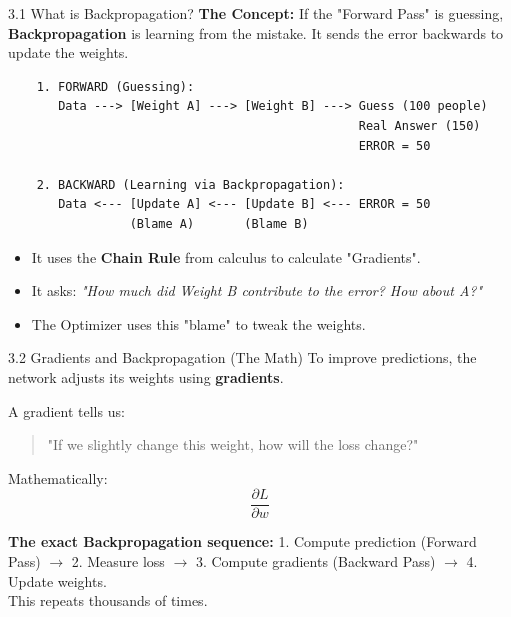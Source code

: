 \documentclass[aspectratio=169]{beamer}
\begin{document}

\begin{frame}[fragile]{3.1 What is Backpropagation?}
    \small
    \textbf{The Concept:}
    If the "Forward Pass" is guessing, \textbf{Backpropagation} is learning from the mistake. It sends the error backwards to update the weights.

    \begin{verbatim}
    1. FORWARD (Guessing):
       Data ---> [Weight A] ---> [Weight B] ---> Guess (100 people)
                                                 Real Answer (150) 
                                                 ERROR = 50
    
    2. BACKWARD (Learning via Backpropagation):
       Data <--- [Update A] <--- [Update B] <--- ERROR = 50
                 (Blame A)       (Blame B)
    \end{verbatim}

    \begin{itemize}
        \item It uses the \textbf{Chain Rule} from calculus to calculate "Gradients".
        \item It asks: \textit{"How much did Weight B contribute to the error? How about A?"}
        \item The Optimizer uses this "blame" to tweak the weights.
    \end{itemize}
\end{frame}

\begin{frame}{3.2 Gradients and Backpropagation (The Math)}
    To improve predictions, the network adjusts its weights using \textbf{gradients}.
    
    A gradient tells us:
    \begin{quote}
    "If we slightly change this weight, how will the loss change?"
    \end{quote}
    
    Mathematically:
    \[
    \frac{\partial L}{\partial w}
    \]
    
    \textbf{The exact Backpropagation sequence:}
    1. Compute prediction (Forward Pass) $\rightarrow$ 2. Measure loss $\rightarrow$ 3. Compute gradients (Backward Pass) $\rightarrow$ 4. Update weights. \\
    This repeats thousands of times.
\end{frame}
\end{document}
